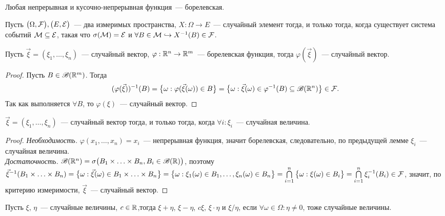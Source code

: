 \begin{statement}
	Любая непрерывная и кусочно-непрерывная функция~--- борелевская.
\end{statement}

\begin{theorem}
	Пусть $\big(\Omega, \mathcal{F}\big), \big(E, \mathcal{E}\big)$~--- два измеримых пространства, $X: \Omega \rightarrow E$~--- случайный элемент тогда, и только тогда, когда существует система событий $\mathcal{M} \subseteq \mathcal{E}$, такая что $\sigma(\mathcal{M}) = \mathcal{E}$ и $\forall B \in \mathcal{M} \hookrightarrow X^{-1}(B) \in \mathcal{F}$.
\end{theorem}

\begin{lemma}
	Пусть $\vec\xi = (\xi_1, \ldots, \xi_n)$~--- случайный вектор, $\varphi: \mathbb{R}^n \rightarrow \mathbb{R}^m$~--- борелевская функция, тогда $\varphi(\vec\xi)$~--- случайный вектор.
	\begin{proof}
		Пусть $B \in \mathscr{B}(\mathbb{R}^m)$. Тогда 
		$$ (\varphi(\vec\xi))^{-1}(B) = \big\{\omega : \varphi(\vec\xi(\omega)) \in B\big\} = \big\{\omega : \vec\xi(\omega) \in \varphi^{-1}(B) \subseteq \mathscr{B}(\mathbb{R}^n) \big\} \in \mathcal{F}. $$ Так как выполняется $\forall B$, то $\varphi(\xi)$~--- случайный вектор.
	\end{proof}
\end{lemma}

\begin{lemma}
	$\vec \xi = (\xi_1, \ldots, \xi_n)$~--- случайный вектор тогда, и только тогда, когда $\forall i : \xi_i$~--- случайная величина.
	\begin{proof}
		\emph{Необходимость.} $\varphi(x_1, \ldots, x_n) = x_i$~--- непрерывная функция, значит борелевская, следовательно, по предыдущей лемме $\xi_i$~--- случайная величина. \\
		\emph{Достаточность.} $\mathscr{B}(\mathbb{R}^n) = \sigma\big(B_1 \times \ldots \times B_n, B_i \in \mathscr{B}(\mathbb{R})\big)$, поэтому $\vec\xi^{-1}(B_1 \times \ldots \times B_n) = \big\{\omega : \vec\xi(\omega) \in B_1 \times \ldots \times B_n\big\} = \big\{\omega : \xi_1(\omega) \in B_1, \ldots, \xi_n(\omega) \in B_n\big\} = \bigcap\limits_{i = 1}^n\big\{\omega: \xi(\omega) \in B_i \big\} = \bigcap\limits_{i = 1}^n \xi_i^{-1}(B_i) \in \mathcal{F}$, значит, по критерию измеримости, $\vec \xi$~--- случайный вектор.
	\end{proof}
\end{lemma}

\begin{consequence}
	Пусть $\xi$, $\eta$~--- случайные величины, $c \in \mathbb{R}$,тогда $\xi + \eta$, $\xi - \eta$, $c\xi$, $\xi \cdot \eta$ и $\xi / \eta$, если $\forall \omega \in \Omega : \eta \neq 0$, тоже случайные величины.
\end{consequence}

